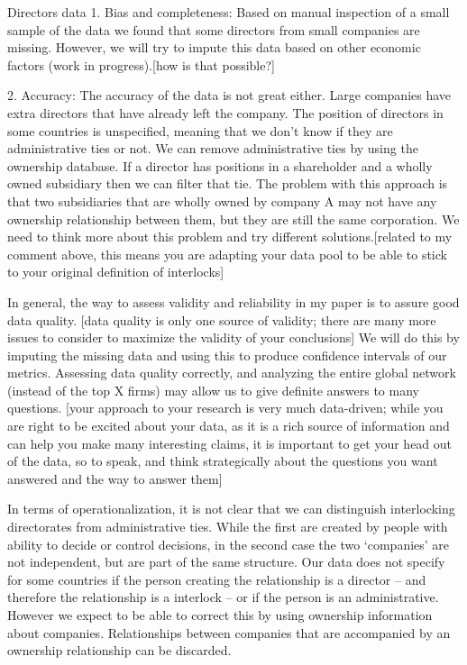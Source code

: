 Directors data
1. Bias and completeness: Based on manual inspection of a small sample of the data we found that some directors from small companies are missing. However, we will try to impute this data based on other economic factors (work in progress).[how is that possible?]

2.  Accuracy: The accuracy of the data is not great either. Large companies have extra directors that have already left the company. The position of directors in some countries is unspecified, meaning that we don’t know if they are administrative ties or not. We can remove administrative ties by using the ownership database. If a director has positions in a shareholder and a wholly owned subsidiary then we can filter that tie. The problem with this approach is that two subsidiaries that are wholly owned by company A may not have any ownership relationship between them, but they are still the same corporation. We need to think more about this problem and try different solutions.[related to my comment above, this means you are adapting your data pool to be able to stick to your original definition of interlocks]

In general, the way to assess validity and reliability in my paper is to assure good data quality. [data quality is only one source of validity; there are many more issues to consider to maximize the validity of your conclusions] We will do this by imputing the missing data and using this to produce confidence intervals of our metrics. Assessing data quality correctly, and analyzing the entire global network (instead of the top X firms) may allow us to give definite answers to many questions.
[your approach to your research is very much data-driven; while you are right to be excited about your data, as it is a rich source of information and can help you make many interesting claims, it is important to get your head out of the data, so to speak, and think strategically about the questions you want answered and the way to answer them]


In terms of operationalization, it is not clear that we can distinguish interlocking directorates from administrative ties. While the first are created by people with ability to decide or control decisions, in the second case the two `companies’ are not independent, but are part of the same structure.  Our data does not specify for some countries if the person creating the relationship is a director -- and therefore the relationship is a interlock -- or if the person is an administrative. However we expect to be able to correct this by using ownership information about companies. Relationships between companies that are accompanied by an ownership relationship can be discarded. 
